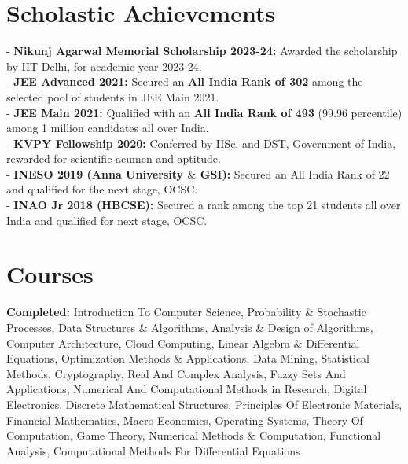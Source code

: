 \documentclass[a4paper,10pt]{article}
\begin{document}
\section{\textbf{Scholastic Achievements}}
- \textbf{Nikunj Agarwal Memorial Scholarship 2023-24:} Awarded the scholarship by IIT Delhi, for academic year 2023-24.\\
- \textbf{JEE Advanced 2021:} Secured an \textbf{All India Rank of 302} among the selected pool of students in JEE Main 2021.\\
- \textbf{JEE Main 2021:} Qualified with an \textbf{All India Rank of 493} (99.96 percentile) among 1 million candidates all over India.\\
- \textbf{KVPY Fellowship 2020:} Conferred by IISc, and DST, Government of India, rewarded for scientific acumen and aptitude.\\
- \textbf{INESO 2019 (Anna University $\&$ GSI):} Secured an All India Rank of 22 and qualified for the next stage, OCSC.\\
- \textbf{INAO Jr 2018 (HBCSE):} Secured a rank among the top 21 students all over India and qualified for next stage, OCSC.

\section{\textbf{Courses}}
\textbf{Completed:} Introduction To Computer Science, Probability \& Stochastic Processes, Data Structures \& Algorithms, Analysis \& Design of Algorithms, Computer Architecture, Cloud Computing, Linear Algebra \& Differential Equations, Optimization Methods \& Applications, Data Mining, Statistical Methods, Cryptography, Real And Complex Analysis, Fuzzy Sets And Applications, Numerical And Computational Methods in Research, Digital Electronics, Discrete Mathematical Structures, Principles Of Electronic Materials, Financial Mathematics,  Macro Economics, Operating Systems, Theory Of Computation, Game Theory, Numerical Methods $\&$ Computation, Functional Analysis, Computational Methods For Differential Equations
\end{document}
